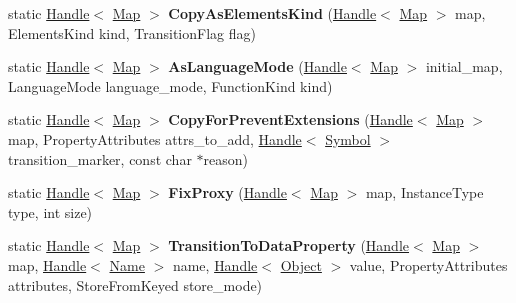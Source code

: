 \begin{DoxyCompactItemize}
\item 
static \hyperlink{classv8_1_1internal_1_1_handle}{Handle}$<$ \hyperlink{classv8_1_1internal_1_1_map}{Map} $>$ {\bfseries Copy\+As\+Elements\+Kind} (\hyperlink{classv8_1_1internal_1_1_handle}{Handle}$<$ \hyperlink{classv8_1_1internal_1_1_map}{Map} $>$ map, Elements\+Kind kind, Transition\+Flag flag)\hypertarget{classv8_1_1internal_1_1_map_a1eeb7d87a60e6cf46bd069bf05b9f563}{}\label{classv8_1_1internal_1_1_map_a1eeb7d87a60e6cf46bd069bf05b9f563}

\item 
static \hyperlink{classv8_1_1internal_1_1_handle}{Handle}$<$ \hyperlink{classv8_1_1internal_1_1_map}{Map} $>$ {\bfseries As\+Language\+Mode} (\hyperlink{classv8_1_1internal_1_1_handle}{Handle}$<$ \hyperlink{classv8_1_1internal_1_1_map}{Map} $>$ initial\+\_\+map, Language\+Mode language\+\_\+mode, Function\+Kind kind)\hypertarget{classv8_1_1internal_1_1_map_afa5658992d3b0cb3ab74c49893efcd07}{}\label{classv8_1_1internal_1_1_map_afa5658992d3b0cb3ab74c49893efcd07}

\item 
static \hyperlink{classv8_1_1internal_1_1_handle}{Handle}$<$ \hyperlink{classv8_1_1internal_1_1_map}{Map} $>$ {\bfseries Copy\+For\+Prevent\+Extensions} (\hyperlink{classv8_1_1internal_1_1_handle}{Handle}$<$ \hyperlink{classv8_1_1internal_1_1_map}{Map} $>$ map, Property\+Attributes attrs\+\_\+to\+\_\+add, \hyperlink{classv8_1_1internal_1_1_handle}{Handle}$<$ \hyperlink{classv8_1_1internal_1_1_symbol}{Symbol} $>$ transition\+\_\+marker, const char $\ast$reason)\hypertarget{classv8_1_1internal_1_1_map_a7c10433c0d9e40ff0e0037c7e9e0399b}{}\label{classv8_1_1internal_1_1_map_a7c10433c0d9e40ff0e0037c7e9e0399b}

\item 
static \hyperlink{classv8_1_1internal_1_1_handle}{Handle}$<$ \hyperlink{classv8_1_1internal_1_1_map}{Map} $>$ {\bfseries Fix\+Proxy} (\hyperlink{classv8_1_1internal_1_1_handle}{Handle}$<$ \hyperlink{classv8_1_1internal_1_1_map}{Map} $>$ map, Instance\+Type type, int size)\hypertarget{classv8_1_1internal_1_1_map_aff1e9e4bf8854a3020fff7b2fbeb1d2c}{}\label{classv8_1_1internal_1_1_map_aff1e9e4bf8854a3020fff7b2fbeb1d2c}

\item 
static \hyperlink{classv8_1_1internal_1_1_handle}{Handle}$<$ \hyperlink{classv8_1_1internal_1_1_map}{Map} $>$ {\bfseries Transition\+To\+Data\+Property} (\hyperlink{classv8_1_1internal_1_1_handle}{Handle}$<$ \hyperlink{classv8_1_1internal_1_1_map}{Map} $>$ map, \hyperlink{classv8_1_1internal_1_1_handle}{Handle}$<$ \hyperlink{classv8_1_1internal_1_1_name}{Name} $>$ name, \hyperlink{classv8_1_1internal_1_1_handle}{Handle}$<$ \hyperlink{classv8_1_1internal_1_1_object}{Object} $>$ value, Property\+Attributes attributes, Store\+From\+Keyed store\+\_\+mode)\hypertarget{classv8_1_1internal_1_1_map_acaead5ba3206e32b89d73b1d4f4aee17}{}\label{classv8_1_1internal_1_1_map_acaead5ba3206e32b89d73b1d4f4aee17}


\end{DoxyCompactItemize}
